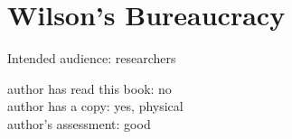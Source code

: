 \section{Wilson's Bureaucracy}

\cite{1991_Wilson}

Intended audience: researchers

author has read this book: no\\
author has a copy: yes, physical\\
author's assessment: good